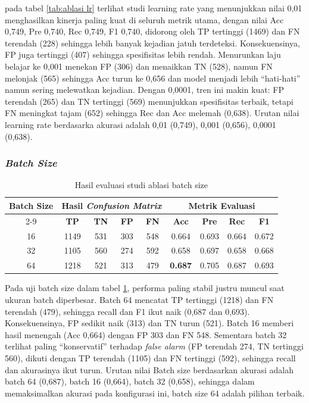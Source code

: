 pada tabel \ref{tab:ablasi lr} terlihat studi learning rate yang menunjukkan nilai 0,01 menghasilkan kinerja paling kuat di seluruh metrik utama, dengan nilai Acc 0,749, Pre 0,740, Rec 0,749, F1 0,740, didorong oleh TP tertinggi (1469) dan FN terendah (228) sehingga lebih banyak kejadian jatuh terdeteksi. Konsekuensinya, FP juga tertinggi (407) sehingga spesifisitas lebih rendah. Menurunkan laju belajar ke 0,001 menekan FP (306) dan menaikkan TN (528), namun FN melonjak (565) sehingga Acc turun ke 0,656 dan model menjadi lebih “hati-hati” namun sering melewatkan kejadian. Dengan 0,0001, tren ini makin kuat: FP terendah (265) dan TN tertinggi (569) menunjukkan spesifisitas terbaik, tetapi FN meningkat tajam (652) sehingga Rec dan Acc melemah (0,638). Urutan nilai learning rate berdasarka akurasi adalah 0,01 (0,749), 0,001 (0,656), 0,0001 (0,638). \par

\subsubsection{\textit{Batch Size}} \label{IV.batch_size}

\begin{table}[htbp]
    \centering
    \caption{Hasil evaluasi studi ablasi batch size}
    \label{tab:ablasi batch size}
    \begin{tabular}{|c|c|c|c|c|c|c|c|c|}
        \hline
        \multirow{2}{*}{\textbf{Batch Size}} & \multicolumn{4}{c|}{\textbf{Hasil \textit{Confusion Matrix}}} & \multicolumn{4}{c|}{\textbf{Metrik Evaluasi}} \\ \cline{2-9}
         & \textbf{TP} & \textbf{TN} & \textbf{FP} & \textbf{FN} & \textbf{Acc} & \textbf{Pre} & \textbf{Rec} & \textbf{F1} \\ \hline
        16 & 1149 & 531 & 303 & 548 & 0.664 & 0.693 & 0.664 & 0.672 \\ \hline
        32 & 1105  & 560 & 274 & 592 & 0.658 & 0.697 & 0.658 & 0.668 \\ \hline
        64 & 1218 & 521 & 313 & 479 & \textbf{0.687} & 0.705 & 0.687 & 0.693 \\ \hline
    \end{tabular}
\end{table}

Pada uji batch size dalam tabel \ref{tab:ablasi batch size}, performa paling stabil justru muncul saat ukuran batch diperbesar. Batch 64 mencatat TP tertinggi (1218) dan FN terendah (479), sehingga recall dan F1 ikut naik (0,687 dan 0,693). Konsekuensinya, FP sedikit naik (313) dan TN turun (521). Batch 16 memberi hasil menengah (Acc 0,664) dengan FP 303 dan FN 548. Sementara batch 32 terlihat paling “konservatif” terhadap \textit{false alarm} (FP terendah 274, TN tertinggi 560), dikuti dengan TP terendah (1105) dan FN tertinggi (592), sehingga recall dan akurasinya ikut turun. Urutan nilai Batch size berdasarkan akurasi adalah batch 64 (0,687), batch 16 (0,664), batch 32 (0,658), sehingga dalam memaksimalkan akurasi pada konfigurasi ini, batch size 64 adalah pilihan terbaik. \par

